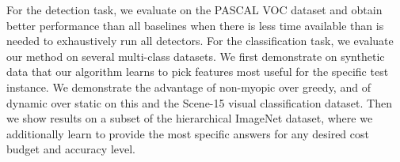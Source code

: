 For the detection task, we evaluate on the PASCAL VOC dataset and obtain better performance than all baselines when there is less time available than is needed to exhaustively run all detectors.
For the classification task, we evaluate our method on several multi-class datasets.
We first demonstrate on synthetic data that our algorithm learns to pick features most useful for the specific test instance.
We demonstrate the advantage of non-myopic over greedy, and of dynamic over static on this and the Scene-15 visual classification dataset.
Then we show results on a subset of the hierarchical ImageNet dataset, where we additionally learn to provide the most specific answers for any desired cost budget and accuracy level.
